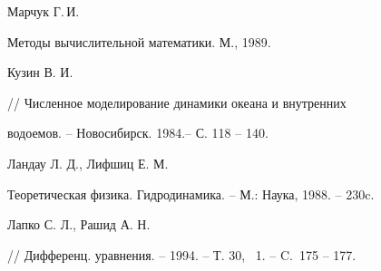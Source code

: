 \bibitem{}


{


Марчук Г.\,И.}


Методы вычислительной математики. М., 1989.





\bibitem{}


 { Кузин В. И.}


// Численное моделирование динамики океана и внутренних


 водоемов. -- Новосибирск. 1984.-- С. 118 -- 140.





\bibitem{}


 { Ландау Л. Д., Лифшиц Е. М.}


 Теоретическая физика. Гидродинамика. -- М.: Наука, 1988. -- 230c.





\bibitem{}


 { Лапко С. Л., Рашид А. Н.}


 // Дифференц. уравнения. -- 1994. -- Т. 30, \No~1. -- C.~175 -- 177.





